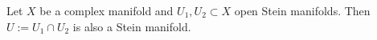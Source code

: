 Let $X$ be a complex manifold and $U_1, U_2 \subset X$ open Stein manifolds. Then $U := U_1 \cap U_2$ is also a Stein manifold.
